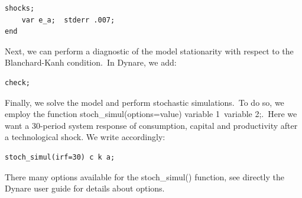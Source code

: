 \documentclass[a4paper,12pt]{article}%
\begin{document}
\vspace{1ex}
\begin{verbatim}
shocks;
	var e_a;  stderr .007;
end
\end{verbatim}
\vspace{1ex}%


Next, we can perform a diagnostic of the model stationarity with respect to
the Blanchard-Kanh condition.\ In Dynare, we add:%

\vspace{1ex}
\begin{verbatim}
check;
\end{verbatim}
\vspace{1ex}%


Finally, we solve the model and perform stochastic simulations.\ To do so, we
employ the function \textsf{stoch\_simul(options=value) variable 1\ variable
2;}.\ Here we want a 30-period system response of consumption, capital and
productivity after a technological shock. We write accordingly:%

\vspace{1ex}
\begin{verbatim}
stoch_simul(irf=30) c k a;
\end{verbatim}
\vspace{1ex}%


There many options available for the \textsf{stoch\_simul()} function, see
directly the Dynare user guide \cite{adjemian2011dynare} for details about options.
\end{document}
